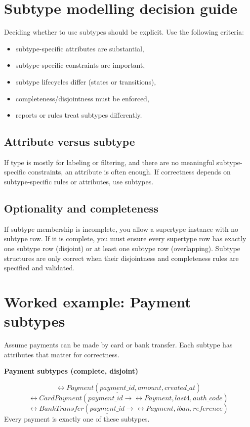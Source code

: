 \section{Subtype modelling decision guide}
Deciding whether to use subtypes should be explicit.
Use the following criteria:
\begin{itemize}[leftmargin=*,nosep]
  \item subtype-specific attributes are substantial,
  \item subtype-specific constraints are important,
  \item subtype lifecycles differ (states or transitions),
  \item completeness/disjointness must be enforced,
  \item reports or rules treat subtypes differently.
\end{itemize}

\subsection{Attribute versus subtype}
If type is mostly for labeling or filtering, and there are no meaningful subtype-specific constraints, an attribute is often enough.
If correctness depends on subtype-specific rules or attributes, use subtypes.

\subsection{Optionality and completeness}
If subtype membership is incomplete, you allow a supertype instance with no subtype row.
If it is complete, you must ensure every supertype row has exactly one subtype row (disjoint) or at least one subtype row (overlapping).
Subtype structures are only correct when their disjointness and completeness rules are specified and validated.

\section{Worked example: Payment subtypes}
Assume payments can be made by card or bank transfer.
Each subtype has attributes that matter for correctness.

\begin{examplebox}
\textbf{Payment subtypes (complete, disjoint)}\par\smallskip
\[
\rel{Payment}(\underline{payment\_id}, amount, created\_at)
\]
\[
\rel{CardPayment}(\underline{payment\_id} \rightarrow \rel{Payment}, last4, auth\_code)
\]
\[
\rel{BankTransfer}(\underline{payment\_id} \rightarrow \rel{Payment}, iban, reference)
\]
Every payment is exactly one of these subtypes.
\end{examplebox}

